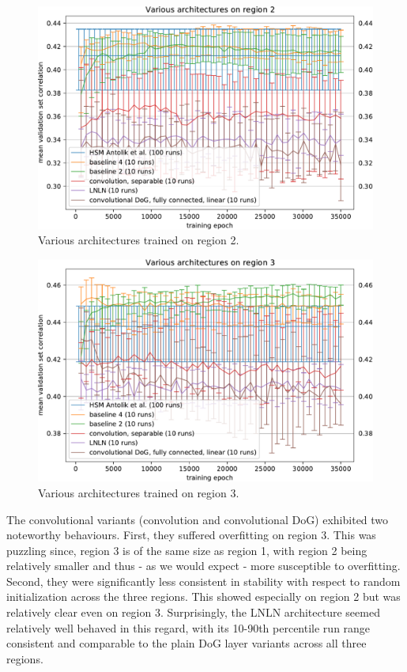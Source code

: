 \begin{figure}[H]
    \centering
    \includegraphics[width=1\textwidth]{../figures/05_3_2_1_2}
    \caption[Various architectures on region 2]{Various architectures trained on region 2.}
    \label{fig:5.3.2.1_2}
\end{figure}

\begin{figure}[H]
    \centering
    \includegraphics[width=1\textwidth]{../figures/05_3_2_1_3}
    \caption[Various architectures on region 3]{Various architectures trained on region 3.}
    \label{fig:5.3.2.1_3}
\end{figure}

The convolutional variants (convolution and convolutional DoG) exhibited two noteworthy behaviours. First, they suffered overfitting on region 3. This was puzzling since, region 3 is of the same size as region 1, with region 2 being relatively smaller and thus - as we would expect - more susceptible to overfitting. Second, they were significantly less consistent in stability with respect to random initialization across the three regions. This showed especially on region 2 but was relatively clear even on region 3. Surprisingly, the LNLN architecture seemed relatively well behaved in this regard, with its 10-90th percentile run range consistent and comparable to the plain DoG layer variants across all three regions.

